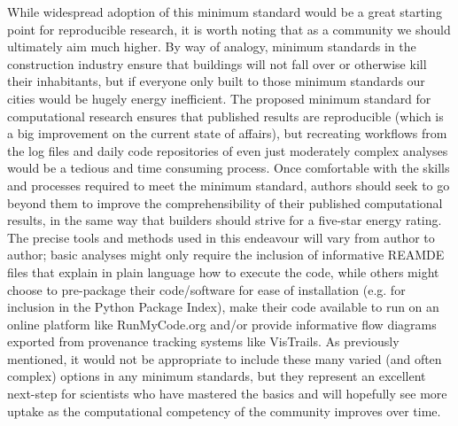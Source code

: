 While widespread adoption of this minimum standard would be a great starting point for reproducible research, it is worth noting that as a community we should ultimately aim much higher. By way of analogy, minimum standards in the construction industry ensure that buildings will not fall over or otherwise kill their inhabitants, but if everyone only built to those minimum standards our cities would be hugely energy inefficient. The proposed minimum standard for computational research ensures that published results are reproducible (which is a big improvement on the current state of affairs), but recreating workflows from the log files and daily code repositories of even just moderately complex analyses would be a tedious and time consuming process. Once comfortable with the skills and processes required to meet the minimum standard, authors should seek to go beyond them to improve the comprehensibility of their published computational results, in the same way that builders should strive for a five-star energy rating. The precise tools and methods used in this endeavour will vary from author to author; basic analyses might only require the inclusion of informative REAMDE files that explain in plain language how to execute the code, while others might choose to pre-package their code/software for ease of installation (e.g. for inclusion in the Python Package Index), make their code available to run on an online platform like RunMyCode.org and/or provide informative flow diagrams exported from provenance tracking systems like VisTrails. As previously mentioned, it would not be appropriate to include these many varied (and often complex) options in any minimum standards, but they represent an excellent next-step for scientists who have mastered the basics and will hopefully see more uptake as the computational competency of the community improves over time.

  







